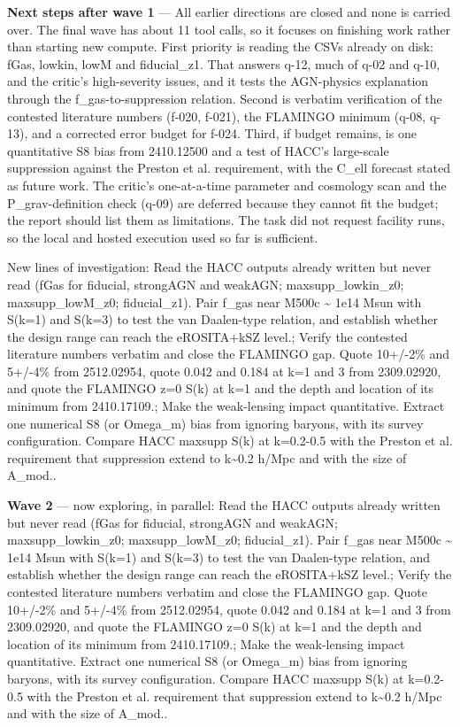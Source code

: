 \documentclass[11pt,a4paper]{article}
\begin{document}
\textbf{Next steps after wave 1} --- All earlier directions are closed and none is carried over. The final wave has about 11 tool calls, so it focuses on finishing work rather than starting new compute. First priority is reading the CSVs already on disk: fGas, lowkin, lowM and fiducial\_z1. That answers q-12, much of q-02 and q-10, and the critic's high-severity issues, and it tests the AGN-physics explanation through the f\_gas-to-suppression relation. Second is verbatim verification of the contested literature numbers (f-020, f-021), the FLAMINGO minimum (q-08, q-13), and a corrected error budget for f-024. Third, if budget remains, is one quantitative S8 bias from 2410.12500 and a test of HACC's large-scale suppression against the Preston et al. requirement, with the C\_ell forecast stated as future work. The critic's one-at-a-time parameter and cosmology scan and the P\_grav-definition check (q-09) are deferred because they cannot fit the budget; the report should list them as limitations. The task did not request facility runs, so the local and hosted execution used so far is sufficient.

New lines of investigation: Read the HACC outputs already written but never read (fGas for fiducial, strongAGN and weakAGN; maxsupp\_lowkin\_z0; maxsupp\_lowM\_z0; fiducial\_z1). Pair f\_gas near M500c \textasciitilde{} 1e14 Msun with S(k=1) and S(k=3) to test the van Daalen-type relation, and establish whether the design range can reach the eROSITA+kSZ level.; Verify the contested literature numbers verbatim and close the FLAMINGO gap. Quote 10+/-2\% and 5+/-4\% from 2512.02954, quote 0.042 and 0.184 at k=1 and 3 from 2309.02920, and quote the FLAMINGO z=0 S(k) at k=1 and the depth and location of its minimum from 2410.17109.; Make the weak-lensing impact quantitative. Extract one numerical S8 (or Omega\_m) bias from ignoring baryons, with its survey configuration. Compare HACC maxsupp S(k) at k=0.2-0.5 with the Preston et al. requirement that suppression extend to k\textasciitilde{}0.2 h/Mpc and with the size of A\_mod..

\textbf{Wave 2} --- now exploring, in parallel: Read the HACC outputs already written but never read (fGas for fiducial, strongAGN and weakAGN; maxsupp\_lowkin\_z0; maxsupp\_lowM\_z0; fiducial\_z1). Pair f\_gas near M500c \textasciitilde{} 1e14 Msun with S(k=1) and S(k=3) to test the van Daalen-type relation, and establish whether the design range can reach the eROSITA+kSZ level.; Verify the contested literature numbers verbatim and close the FLAMINGO gap. Quote 10+/-2\% and 5+/-4\% from 2512.02954, quote 0.042 and 0.184 at k=1 and 3 from 2309.02920, and quote the FLAMINGO z=0 S(k) at k=1 and the depth and location of its minimum from 2410.17109.; Make the weak-lensing impact quantitative. Extract one numerical S8 (or Omega\_m) bias from ignoring baryons, with its survey configuration. Compare HACC maxsupp S(k) at k=0.2-0.5 with the Preston et al. requirement that suppression extend to k\textasciitilde{}0.2 h/Mpc and with the size of A\_mod..
\end{document}
